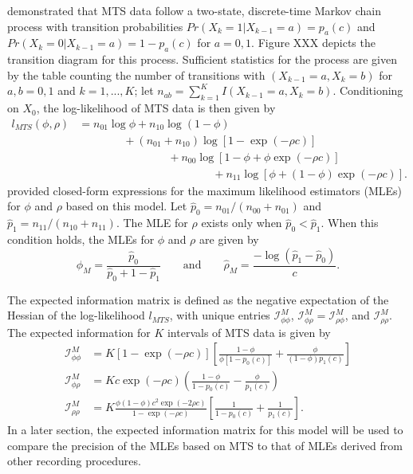 \documentclass[man, noextraspace, floatsintext]{apa6}\usepackage[]{graphicx}\usepackage[]{color}
\newcommand{\info}{\mathcal{I}}
\begin{document}
\citet{Brown1977estimation} demonstrated that MTS data follow a two-state, discrete-time Markov chain process with transition probabilities $Pr(X_k = 1 | X_{k-1} = a) = p_a(c)$ and $Pr(X_k = 0 | X_{k-1} = a) = 1 - p_a(c)$ for $a = 0,1$. 
Figure XXX depicts the transition diagram for this process.
Sufficient statistics for the process are given by the table counting the number of transitions with $(X_{k-1} = a, X_k = b)$ for $a,b = 0,1$ and $k = 1,...,K$; let $n_{ab} = \sum_{k=1}^{K} I(X_{k-1} = a, X_k = b)$. 
Conditioning on $X_0$, the log-likelihood of MTS data is then given by \begin{equation}
\begin{aligned}
\label{eq:MTS_loglik}
l_{MTS}(\phi, \rho) &= n_{01} \log \phi + n_{10} \log\left(1 - \phi\right) \\
& \qquad \qquad + \left(n_{01} + n_{10}\right) \log \left[1 - \exp\left(-\rho c\right)\right] \\
& \qquad \qquad \qquad \qquad + n_{00} \log\left[1 - \phi + \phi \exp\left(-\rho c\right)\right]\\
& \qquad \qquad \qquad \qquad \qquad \qquad + n_{11}\log\left[\phi + \left(1 - \phi\right)\exp\left(-\rho c \right)\right].
\end{aligned}
\end{equation}
\citet{Brown1977estimation} provided closed-form expressions for the maximum likelihood estimators (MLEs) for $\phi$ and $\rho$ based on this model. Let $\hat{p}_0 = n_{01}/ \left(n_{00} + n_{01}\right)$ and $\hat{p}_1 = n_{11} / \left(n_{10} + n_{11}\right)$. The MLE for $\rho$ exists only when $\hat{p}_0 < \hat{p}_1$. 
When this condition holds, the MLEs for $\phi$ and $\rho$ are given by 
\begin{equation}
\label{eq:MTS_mle}
\hat\phi_{M} = \frac{\hat{p}_0}{\hat{p}_0 + 1 - \hat{p}_1} \qquad \text{and} \qquad
\hat\rho_{M} = \frac{- \log(\hat{p}_1 - \hat{p}_0)}{c}.
\end{equation}

The expected information matrix is defined as the negative expectation of the Hessian of the log-likelihood $l_{MTS}$, with unique entries $\info^{M}_{\phi\phi}$, $\info^{M}_{\phi\rho} = \info^{M}_{\rho\phi}$, and $\info^{M}_{\rho\rho}$.
The expected information for $K$ intervals of MTS data is given by  
\begin{equation}
\label{eq:MTS_Info}
\begin{aligned}
\info^{M}_{\phi\phi} &= K \left[1 - \exp\left(-\rho c\right)\right]\left[ \frac{1 - \phi}{\phi \left[1 - p_0(c)\right]} + \frac{\phi}{(1 - \phi)p_1(c)}\right] \\ 
\info^{M}_{\phi\rho} &= K c \exp(-  \rho c) \left(\frac{1 - \phi}{1 - p_0(c)} - \frac{\phi}{p_1(c)}\right)\\
\info^{M}_{\rho\rho} &= K \frac{\phi(1 - \phi)c^2 \exp(-2\rho c)}{1 - \exp(-\rho c)}\left[\frac{1}{1 - p_0(c)} + \frac{1}{p_1(c)}\right].
\end{aligned}
\end{equation}
In a later section, the expected information matrix for this model will be used to compare the precision of the MLEs based on MTS to that of MLEs derived from other recording procedures. 
\end{document}
